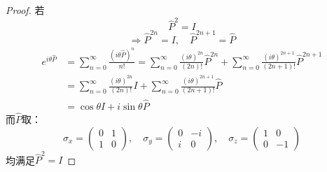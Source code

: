 \documentclass[11pt, a4paper]{ctexart}
\title{}
\author{}
\date{}
\begin{document}
\maketitle
\begin{proof}
若
\[
\hat{P}^2=I
\]
\[
\Rightarrow \hat{P}^{2n}=I ,\quad \hat{P}^{2n+1}=\hat{P}
\]
\begin{align*}
e^{i\theta \hat{P}}&=\sum_{n=0}^{\infty}\frac{(i\theta \hat{P})^n}{n!}=\sum_{n=0}^{\infty}\frac{(i\theta)^{2n}}{(2n)!}\hat{P}^{2n}+\sum_{n=0}^{\infty}\frac{(i\theta)^{2n+1}}{(2n+1)!}\hat{P}^{2n+1}\\
&=\sum_{n=0}^{\infty}\frac{(i\theta)^{2n}}{(2n)!}I+\sum_{n=0}^{\infty}\frac{(i\theta)^{2n+1}}{(2n+1)!}\hat{P}\\
&=\cos \theta I+i\sin \theta \hat{P}
\end{align*}
而$\hat P$取：
\begin{equation*}
\sigma_x = \begin{pmatrix} 0 & 1 \\ 1 & 0 \end{pmatrix}, \quad
\sigma_y = \begin{pmatrix} 0 & -i \\ i & 0 \end{pmatrix}, \quad
\sigma_z = \begin{pmatrix} 1 & 0 \\ 0 & -1 \end{pmatrix}
\end{equation*}
均满足$\hat{P}^2=I$
\end{proof}
\end{document}
